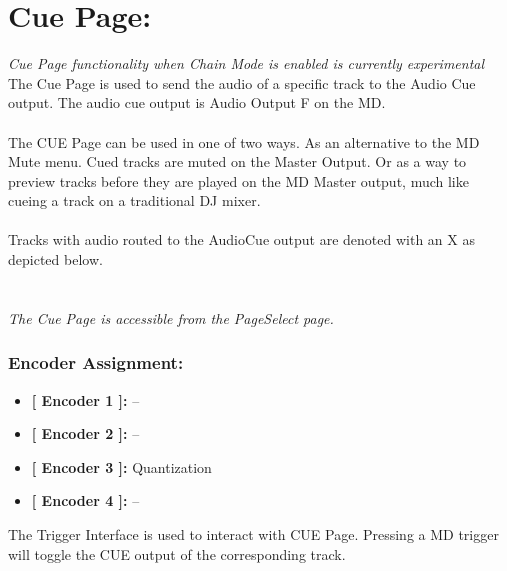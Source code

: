  \chapter{Cue Page:}
 \textit{Cue Page functionality when Chain Mode is enabled is currently experimental}\\
 The Cue Page is used to send the audio of a specific track to the Audio Cue output. The audio cue output is Audio Output F on the MD.\\
 \\
 The CUE Page can be used in one of two ways. As an alternative to the MD Mute menu. Cued tracks are muted on the Master Output. Or as a way to preview tracks before they are played on the MD Master output, much like cueing a track on a traditional DJ mixer.\\
\\Tracks with audio routed to the AudioCue output are denoted with an X as depicted below.\\

\\\\
 \textit{The Cue Page is accessible from the PageSelect page.}
  \subsection{Encoder Assignment:}
 \begin{itemize}
 	\item \textbf{[ Encoder 1 ]: } --
 	\item \textbf{[ Encoder 2 ]: } --
 	\item \textbf{[ Encoder 3 ]: } Quantization
 	\item \textbf{[ Encoder 4 ]: } --
 \end{itemize}
 The Trigger Interface is used to interact with CUE Page. Pressing a MD trigger will toggle the CUE output of the corresponding track.
 
